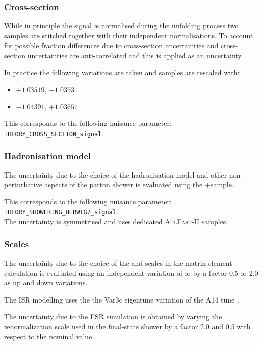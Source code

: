\subsubsection{Cross-section}
While in principle the signal is normalised during the unfolding process
two samples are stitched together with their independent normalisations.
To account for possible fraction differences due to cross-section uncertainties
\ttbar and \tW cross-section uncertainties are anti-correlated and this
is applied as an uncertainty.

In practice the following variations are taken and samples are rescaled with:

\begin{itemize}
  \item \ttbar \( +1.03519 \), \tW \( -1.03531 \)
  \item \ttbar \( -1.04391 \), \tW \( +1.03657 \)
\end{itemize}

This corresponds to the following nuisance parameter: \texttt{THEORY\_CROSS\_SECTION\_signal}.

\subsubsection{Hadronisation model}%
\label{sec:systematics:partonshower}
The uncertainty due to the choice of the hadronisation model and other
non-perturbative aspects of the parton shower is evaluated using the
\POWHEG{}+\HERWIG[7] sample.

This corresponds to the following nuisance parameter: \texttt{THEORY\_SHOWERING\_HERWIG7\_signal}.
\\The uncertainty is symmetrised and uses dedicated \textsc{AtlFast-II} samples.

\subsubsection{Scales}%
\label{sec:systematics:scale}
The uncertainty due to the choice of the \muR and \muF scales in
the matrix element calculation is evaluated using an independent variation
of \muR or \muF by a factor 0.5 or 2.0 as up and down variations.

The ISR modelling uses the the Var3c eigentune variation of the A14
tune~\cite{ATL-PHYS-PUB-2017-007}.

The uncertainty due to the FSR simulation is obtained by varying
the renormalization scale used in the final-state shower
by a factor 2.0 and 0.5 with respect to the nominal value.

